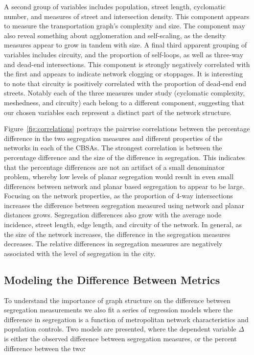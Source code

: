 \documentclass[
  10pt,
]{article}
\providecommand{\DIFaddtex}[1]{{\protect\color{blue}\uwave{#1}}} %
\providecommand{\DIFdeltex}[1]{{\protect\color{red}\sout{#1}}}                      %
\providecommand{\DIFaddbegin}{} %
\providecommand{\DIFaddend}{} %
\providecommand{\DIFdelbegin}{} %
\providecommand{\DIFdelend}{} %
\providecommand{\DIFadd}[1]{\texorpdfstring{\DIFaddtex{#1}}{#1}} %
\providecommand{\DIFdel}[1]{\texorpdfstring{\DIFdeltex{#1}}{}} %
\newcommand{\DIFscaledelfig}{0.5}
\newlength{\DIFdelgraphicswidth} %
\newlength{\DIFdelgraphicsheight} %
\newcommand{\DIFaddincludegraphics}[2][]{{\color{blue}\fbox{\DIFOincludegraphics[#1]{#2}}}} %
\newcommand{\DIFdelincludegraphics}[2][]{%
\sbox{\DIFdelgraphicsbox}{\DIFOincludegraphics[#1]{#2}}%
\settoboxwidth{\DIFdelgraphicswidth}{\DIFdelgraphicsbox} %
\settoboxtotalheight{\DIFdelgraphicsheight}{\DIFdelgraphicsbox} %
\scalebox{\DIFscaledelfig}{%
\parbox[b]{\DIFdelgraphicswidth}{\usebox{\DIFdelgraphicsbox}\\[-\baselineskip] \rule{\DIFdelgraphicswidth}{0em}}\llap{\resizebox{\DIFdelgraphicswidth}{\DIFdelgraphicsheight}{%
\setlength{\unitlength}{\DIFdelgraphicswidth}%
\begin{picture}(1,1)%
\thicklines\linethickness{2pt} %
{\color[rgb]{1,0,0}\put(0,0){\framebox(1,1){}}}%
{\color[rgb]{1,0,0}\put(0,0){\line( 1,1){1}}}%
{\color[rgb]{1,0,0}\put(0,1){\line(1,-1){1}}}%
\end{picture}%
}\hspace*{3pt}}} %
} %
\DeclareRobustCommand{\DIFaddbegin}{\DIFOaddbegin \let\includegraphics\DIFaddincludegraphics} %
\DeclareRobustCommand{\DIFaddend}{\DIFOaddend \let\includegraphics\DIFOincludegraphics} %
\DeclareRobustCommand{\DIFdelbegin}{\DIFOdelbegin \let\includegraphics\DIFdelincludegraphics} %
\DeclareRobustCommand{\DIFdelend}{\DIFOaddend \let\includegraphics\DIFOincludegraphics} %
\begin{document}
A second group of variables includes population, street length,
cyclomatic number, and measures of street and intersection density. This
component appears to measure the transportation graph's complexity and
size. The component may also reveal something about agglomeration and
self-scaling, as the density measures appear to grow in tandem with
size. A final third apparent grouping of variables includes circuity,
and the proportion of self-loops, as well as three-way and dead-end
intersections. This component is strongly negatively correlated with the
first and appears to indicate network clogging or stoppages. It is
interesting to note that circuity is positively correlated with the
proportion of dead-end end streets. Notably each of the three measures
under study (cyclomatic complexity, meshedness, and circuity) each
belong to a different component, suggesting that our chosen variables
each represent a distinct part of the network structure.

Figure~\ref{fig:correlations} \DIFaddbegin \DIFadd{in the supplementary material }\DIFaddend portrays the
pairwise correlations between the percentage difference in the two
segregation measures and different properties of the networks in each of
the CBSAs. The strongest correlation is between the percentage
difference and the size of the difference in segregation. This indicates
that the percentage differences are not an artifact of a small
denominator problem, whereby low levels of planar segregation would
result in even small differences between network and planar based
segregation to appear to be large. Focusing on the network properties,
as the proportion of 4-way intersections increases the difference
between segregation measured using network and planar distances grows.
Segregation differences also grow with the average node incidence,
street length, edge length, and circuity of the network. In general, as
the size of the network increases, the difference in the segregation
measures decreases. The relative differences in segregation measures are
negatively associated with the level of segregation in the city.

\hypertarget{modeling-the-difference-between-metrics}{%
\subsection{Modeling the Difference Between
Metrics}\label{modeling-the-difference-between-metrics}}

To understand the importance of graph structure on the difference
between segregation measurements we also fit a series of regression
models where the difference in segregation is a function of metropolitan
network characteristics and population controls. Two models are
presented, where the dependent variable \(\Delta\) is either the
observed difference between segregation measures, or the percent
difference between the two\DIFdelbegin \DIFdel{.
}\DIFdelend \DIFaddbegin \DIFadd{:
}\DIFaddend 
\end{document}
